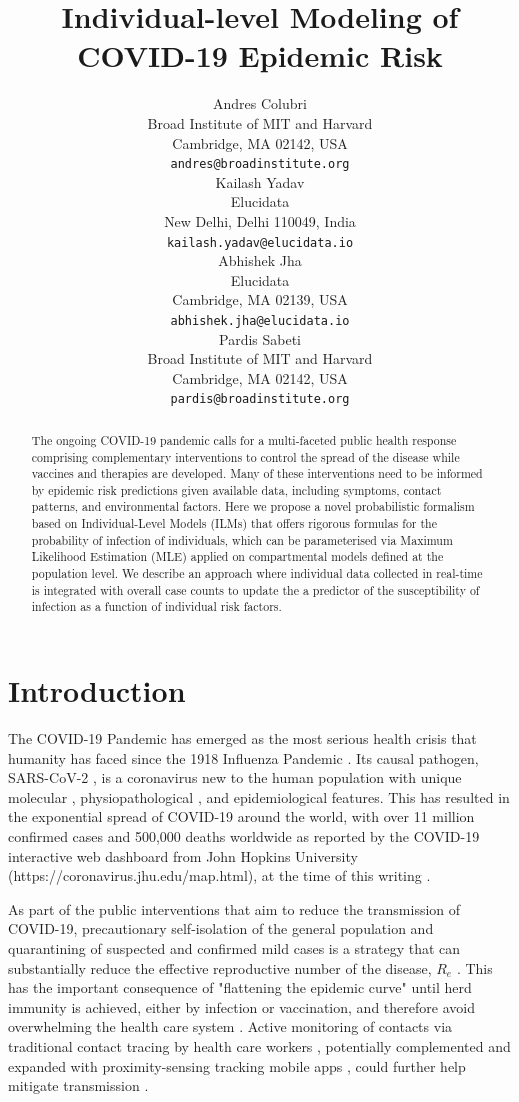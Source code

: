 \documentclass{article}
\title{Individual-level Modeling of COVID-19 Epidemic Risk}
\author{
 Andres Colubri \\
  Broad Institute of MIT and Harvard\\
  Cambridge, MA 02142, USA \\
  \texttt{andres@broadinstitute.org} \\
  \And
 Kailash Yadav \\
  Elucidata\\
  New Delhi, Delhi 110049, India \\
  \texttt{kailash.yadav@elucidata.io} \\
  \And  
 Abhishek Jha \\
  Elucidata\\
  Cambridge, MA 02139, USA \\
  \texttt{abhishek.jha@elucidata.io} \\  
   \And
   Pardis Sabeti \\
   Broad Institute of MIT and Harvard\\
   Cambridge, MA 02142, USA \\
   \texttt{pardis@broadinstitute.org} \\
}
\begin{document}
\maketitle

\begin{abstract}
The ongoing COVID-19 pandemic calls for a multi-faceted public health response comprising complementary interventions to control the spread of the disease while vaccines and therapies are developed. Many of these interventions need to be informed by epidemic risk predictions given available data, including symptoms, contact patterns, and environmental factors. Here we propose a novel probabilistic formalism based on Individual-Level Models (ILMs) that offers rigorous formulas for the probability of infection of individuals, which can be parameterised via Maximum Likelihood Estimation (MLE) applied on compartmental models defined at the population level. We describe an approach where individual data collected in real-time is integrated with overall case counts to update the a predictor of the susceptibility of infection as a function of individual risk factors.
\end{abstract}




\section{Introduction}
The COVID-19 Pandemic \cite{Velavan2020, Fauci2020} has emerged as the most serious health crisis that humanity has faced since the 1918 Influenza Pandemic \cite{Viboud2018}. Its causal pathogen, SARS-CoV-2 \cite{Lu2020}, is a coronavirus new to the human population with unique molecular \cite{Wrapp2020}, physiopathological \cite{Zou2020}, and epidemiological \cite{Liu2020} features. This has resulted in the exponential spread of COVID-19 around the world, with over 11 million confirmed cases and 500,000 deaths worldwide as reported by the COVID-19 interactive web dashboard from John Hopkins University (https://coronavirus.jhu.edu/map.html), at the time of this writing \cite{Dong2020}.

As part of the public interventions that aim to reduce the transmission of COVID-19, precautionary self-isolation of the general population and quarantining of suspected and confirmed mild cases is a strategy that can substantially reduce the effective reproductive number of the disease, $R_e$ \cite{Wang2020}. This has the important consequence of "flattening the epidemic curve" until herd immunity is achieved, either by infection or vaccination, and therefore avoid overwhelming the health care system \cite{Kissler2020}. Active monitoring of contacts via traditional contact tracing by health care workers \cite{eames2003}, potentially complemented and expanded with proximity-sensing tracking mobile apps \cite{Ferretti2020}, could further help mitigate transmission \cite{Peak2020}.
\end{document}
